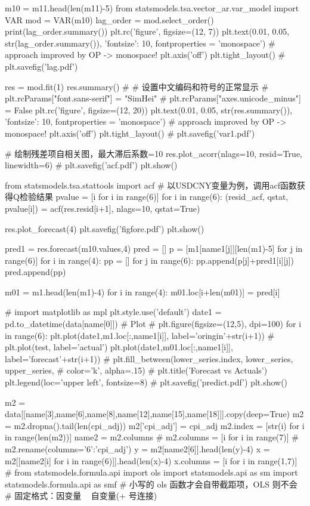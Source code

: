 \documentclass[a4paper,AutoFakeBold,AutoFakeSlant]{ctexart}
\begin{document}
\begin{python}
m10 = m11.head(len(m11)-5)
from statsmodels.tsa.vector_ar.var_model import VAR
mod = VAR(m10)
lag_order = mod.select_order()
print(lag_order.summary())
plt.rc('figure', figsize=(12, 7))
plt.text(0.01, 0.05, str(lag_order.summary()), {'fontsize': 10}, fontproperties = 'monospace') # approach improved by OP -> monospace!
plt.axis('off')
plt.tight_layout()
# plt.savefig('lag.pdf')

res = mod.fit(1)
res.summary()
# # 设置中文编码和符号的正常显示
# plt.rcParams["font.sans-serif"] = "SimHei"
# plt.rcParams["axes.unicode_minus"] = False
plt.rc('figure', figsize=(12, 20))
plt.text(0.01, 0.05, str(res.summary()), {'fontsize': 10}, fontproperties = 'monospace') # approach improved by OP -> monospace!
plt.axis('off')
plt.tight_layout()
# plt.savefig('var1.pdf')

# 绘制残差项自相关图，最大滞后系数=10
res.plot_acorr(nlags=10, resid=True, linewidth=6)
# plt.savefig('acf.pdf')
plt.show()

from statsmodels.tsa.stattools import acf
# 以USDCNY变量为例，调用acf函数获得Q检验结果
pvalue = [i for i in range(6)]
for i in range(6):
    (resid_acf, qstat, pvalue[i]) = acf(res.resid[i+1], nlags=10, qstat=True)

res.plot_forecast(4)
plt.savefig('figfore.pdf')
plt.show()

pred1 = res.forecast(m10.values,4)
pred =  []
p = [m1[name1[j]][len(m1)-5] for j in range(6)]
for i in range(4):
    pp = []
    for j in range(6):
        pp.append(p[j]+pred1[i][j])
    pred.append(pp)

m01 = m1.head(len(m1)-4)
for i in range(4):
    m01.loc[i+len(m01)] = pred[i]

    # import matplotlib as mpl
plt.style.use('default')
date1 = pd.to_datetime(data[name[0]])
# Plot
# plt.figure(figsize=(12,5), dpi=100)
for i in range(6):
    plt.plot(date1,m1.loc[:,name1[i]], label='oringin'+str(i+1))
    # plt.plot(test, label='actual')
    plt.plot(date1,m01.loc[:,name1[i]], label='forecast'+str(i+1))
# plt.fill_between(lower_series.index, lower_series, upper_series, 
#                  color='k', alpha=.15)
# plt.title('Forecast vs Actuals')
plt.legend(loc='upper left', fontsize=8)
# plt.savefig('predict.pdf')
plt.show()

m2 = data[[name[3],name[6],name[8],name[12],name[15],name[18]]].copy(deep=True)
m2 = m2.dropna().tail(len(cpi_adj))
m2['cpi_adj'] = cpi_adj
m2.index = [str(i) for i in range(len(m2))]
name2 = m2.columns
# m2.columns = [i for i in range(7)]
# m2.rename(columns={'6':'cpi_adj'})
y = m2[name2[6]].head(len(y)-4)
x = m2[[name2[i] for i in range(6)]].head(len(x)-4)
x.columns = [i for i in range(1,7)]
# from statsmodels.formula.api import ols
import statsmodels.api as sm
import statsmodels.formula.api as smf
# 小写的 ols 函数才会自带截距项，OLS 则不会
# 固定格式：因变量 ~ 自变量(+ 号连接)


\end{python}
\end{document}
